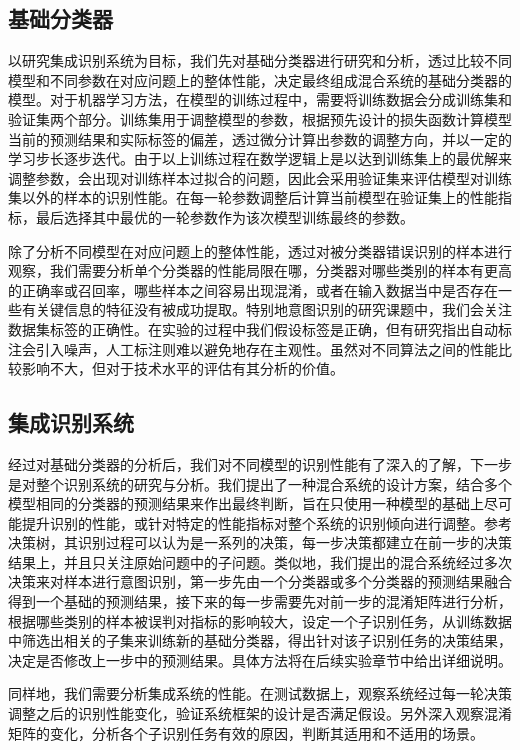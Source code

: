 \subsection{基础分类器}

以研究集成识别系统为目标，我们先对基础分类器进行研究和分析，透过比较不同模型和不同参数在对应问题上的整体性能，决定最终组成混合系统的基础分类器的模型。对于机器学习方法，在模型的训练过程中，需要将训练数据会分成训练集和验证集两个部分。训练集用于调整模型的参数，根据预先设计的损失函数计算模型当前的预测结果和实际标签的偏差，透过微分计算出参数的调整方向，并以一定的学习步长逐步迭代。由于以上训练过程在数学逻辑上是以达到训练集上的最优解来调整参数，会出现对训练样本过拟合的问题，因此会采用验证集来评估模型对训练集以外的样本的识别性能。在每一轮参数调整后计算当前模型在验证集上的性能指标，最后选择其中最优的一轮参数作为该次模型训练最终的参数。

除了分析不同模型在对应问题上的整体性能，透过对被分类器错误识别的样本进行观察，我们需要分析单个分类器的性能局限在哪，分类器对哪些类别的样本有更高的正确率或召回率，哪些样本之间容易出现混淆，或者在输入数据当中是否存在一些有关键信息的特征没有被成功提取。特别地意图识别的研究课题中，我们会关注数据集标签的正确性。在实验的过程中我们假设标签是正确，但有研究指出自动标注会引入噪声\cite{littlestone1988learning}，人工标注则难以避免地存在主观性。虽然对不同算法之间的性能比较影响不大，但对于技术水平的评估有其分析的价值。

\subsection{集成识别系统}

经过对基础分类器的分析后，我们对不同模型的识别性能有了深入的了解，下一步是对整个识别系统的研究与分析。我们提出了一种混合系统的设计方案，结合多个模型相同的分类器的预测结果来作出最终判断，旨在只使用一种模型的基础上尽可能提升识别的性能，或针对特定的性能指标对整个系统的识别倾向进行调整。参考决策树，其识别过程可以认为是一系列的决策，每一步决策都建立在前一步的决策结果上，并且只关注原始问题中的子问题。类似地，我们提出的混合系统经过多次决策来对样本进行意图识别，第一步先由一个分类器或多个分类器的预测结果融合得到一个基础的预测结果，接下来的每一步需要先对前一步的混淆矩阵进行分析，根据哪些类别的样本被误判对指标的影响较大，设定一个子识别任务，从训练数据中筛选出相关的子集来训练新的基础分类器，得出针对该子识别任务的决策结果，决定是否修改上一步中的预测结果。具体方法将在后续实验章节中给出详细说明。

同样地，我们需要分析集成系统的性能。在测试数据上，观察系统经过每一轮决策调整之后的识别性能变化，验证系统框架的设计是否满足假设。另外深入观察混淆矩阵的变化，分析各个子识别任务有效的原因，判断其适用和不适用的场景。
